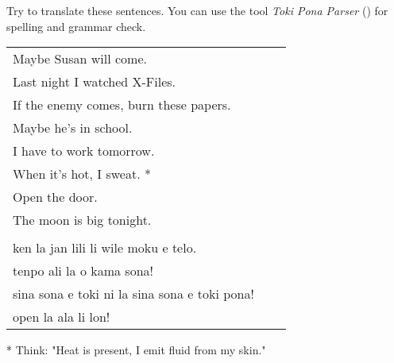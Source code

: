 Try to translate these sentences. 
You can use the tool \textit{Toki Pona Parser} (\cite{www:rowa:02}) for spelling and grammar check. 

\begin{supertabular}{p{5,5cm}|ll}
Maybe Susan will come.  && \\ %
Last night I watched X-Files.  &&   \\ %
If the enemy comes, burn these papers.  &&   \\ %
Maybe he's in school.  &&   \\ %
I have to work tomorrow.  &&   \\ %
When it's hot, I sweat. *  &&  \\ %
Open the door.   &&  \\ %
The moon is big tonight.   &&  \\ %
 && \\ %
ken la jan lili li wile moku e telo.  &&   \\ %
tenpo ali la o kama sona!   &&  \\ %
sina sona e toki ni la sina sona e toki pona!   &&  \\ %
open la ala li lon! &&  \\  %
\end{supertabular}

* Think: "Heat is present, I emit fluid from my skin."
